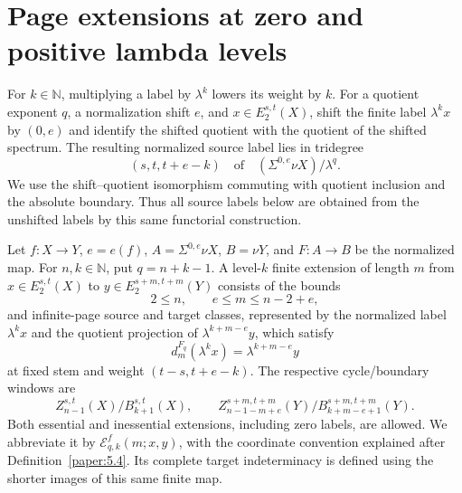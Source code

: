 \section{Page extensions at zero and positive lambda levels}

\begin{definition}
\label{sem:ProofTools:level-finite-extension}
\label{sem:ProofTools:extension-level-zero}

For $k\in\mathbb N$, multiplying a label by $\lambda^k$ lowers its
weight by $k$. For a quotient exponent $q$, a normalization shift $e$, and
$x\in E_2^{s,t}(X)$, shift the finite label $\lambda^kx$ by $(0,e)$
and identify the shifted quotient with the quotient of the shifted
spectrum. The resulting normalized source label lies in tridegree
\[(s,t,t+e-k)\quad\text{of}\quad (\Sigma^{0,e}\nu X)/\lambda^q.\]
We use the shift--quotient isomorphism commuting with quotient inclusion
and the absolute boundary. Thus all source labels below are obtained
from the unshifted labels by this same functorial construction.

Let $f:X\to Y$, $e=e(f)$, $A=\Sigma^{0,e}\nu X$, $B=\nu Y$, and $F:A\to B$ be the normalized map. For $n,k\in\mathbb N$, put $q=n+k-1$. A level-$k$ finite extension of length $m$ from $x\in E_2^{s,t}(X)$ to $y\in E_2^{s+m,t+m}(Y)$ consists of the bounds
\[2\le n,\qquad e\le m\le n-2+e,\]
and infinite-page source and target classes, represented by the normalized label $\lambda^k x$ and the quotient projection of $\lambda^{k+m-e}y$, which satisfy
\[d_m^{F_q}(\lambda^k x)=\lambda^{k+m-e}y\]
at fixed stem and weight $(t-s,t+e-k)$. The respective cycle/boundary windows are
\[Z_{n-1}^{s,t}(X)/B_{k+1}^{s,t}(X),\qquad
Z_{n-1-m+e}^{s+m,t+m}(Y)/B_{k+m-e+1}^{s+m,t+m}(Y).\]
Both essential and inessential extensions, including zero labels, are allowed.
We abbreviate it by $\mathcal E^f_{q,k}(m;x,y)$, with the coordinate
convention explained after Definition~\ref{paper:5.4}.
Its complete target indeterminacy is defined using the shorter images
of this same finite map.


\end{definition}
